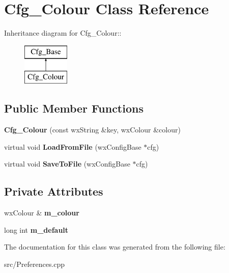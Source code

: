 \section{Cfg\_\-Colour Class Reference}
\label{classCfg__Colour}
Inheritance diagram for Cfg\_\-Colour::\begin{figure}[H]
\begin{center}
\leavevmode
\includegraphics[height=2cm]{classCfg__Colour}
\end{center}
\end{figure}
\subsection*{Public Member Functions}
\begin{DoxyCompactItemize}
\item 
{\bfseries Cfg\_\-Colour} (const wxString \&key, wxColour \&colour)\label{classCfg__Colour_a0a282b3e10e4ca5b5f245f1c87d16837}

\item 
virtual void {\bf LoadFromFile} (wxConfigBase $\ast$cfg)\label{classCfg__Colour_a6f83e8846d98410200650239fdf2258b}

\item 
virtual void {\bf SaveToFile} (wxConfigBase $\ast$cfg)\label{classCfg__Colour_a92aea1d39f38ab1499554eee63fd83c6}

\end{DoxyCompactItemize}
\subsection*{Private Attributes}
\begin{DoxyCompactItemize}
\item 
wxColour \& {\bfseries m\_\-colour}\label{classCfg__Colour_a4ba4fc68cf3fec29d65264d84beeb23a}

\item 
long int {\bfseries m\_\-default}\label{classCfg__Colour_ab3eb56470f3568e65562671684b15afe}

\end{DoxyCompactItemize}


The documentation for this class was generated from the following file:\begin{DoxyCompactItemize}
\item 
src/Preferences.cpp\end{DoxyCompactItemize}

